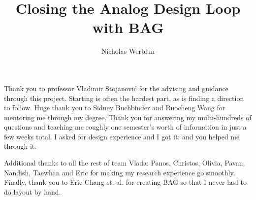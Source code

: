 \documentclass[masters]{ucbthesis}
\begin{document}

\title{Closing the Analog Design Loop with BAG}
\author{Nicholas Werblun}


\maketitle
\copyrightpage



\begin{frontmatter}



\tableofcontents
\clearpage
\listoffigures
\clearpage

\begin{acknowledgements}
Thank you to professor Vladimir Stojanovi\'c for the advising and guidance through this project. Starting is often the hardest part, as is finding a direction to follow. Huge thank you to Sidney Buchbinder and Ruocheng Wang for mentoring me through my degree. Thank you for answering my multi-hundreds of questions and teaching me roughly one semester's worth of information in just a few weeks total.  I asked for design experience and I got it; and you helped me through it.

Additional thanks to all the rest of team Vlada: Panos, Christos, Olivia, Pavan, Nandish, Taewhan and Eric for making my research experience go smoothly. Finally, thank you to Eric Chang et. al. for creating BAG so that I never had to do layout by hand.

\end{acknowledgements}

\end{frontmatter}
\pagestyle{headings}
\end{document}
